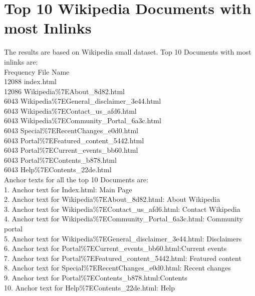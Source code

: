 \documentclass[12pt]{report}
\begin{document}
\section{Top 10 Wikipedia Documents with most Inlinks}
The results are based on Wikipedia small dataset.
 Top 10 Documents with most inlinks are:\\
Frequency File Name\\
  12088 index.html\\
  12086 Wikipedia\%7EAbout\_8d82.html\\
   6043 Wikipedia\%7EGeneral\_disclaimer\_3e44.html\\
   6043 Wikipedia\%7EContact\_us\_afd6.html\\
   6043 Wikipedia\%7ECommunity\_Portal\_6a3c.html\\
   6043 Special\%7ERecentChanges\_e0d0.html\\
   6043 Portal\%7EFeatured\_content\_5442.html\\
   6043 Portal\%7ECurrent\_events\_bb60.html\\
   6043 Portal\%7EContents\_b878.html\\
   6043 Help\%7EContents\_22de.html\\

Anchor texts for all the top 10 Documents are:\\

1. Anchor text for Index.html: Main Page\\
2. Anchor text for Wikipedia\%7EAbout\_8d82.html: About Wikipedia\\ 
3. Anchor text for Wikipedia\%7EContact\_us\_afd6.html: Contact Wikipedia\\
4. Anchor text for Wikipedia\%7ECommunity\_Portal\_6a3c.html: Community portal\\
5. Anchor text for Wikipedia\%7EGeneral\_disclaimer\_3e44.html: Disclaimers\\
6. Anchor text for Portal\%7ECurrent\_events\_bb60.html:Current events\\
7. Anchor text for Portal\%7EFeatured\_content\_5442.html: Featured content\\
8. Anchor text for Special\%7ERecentChanges\_e0d0.html: Recent changes\\
9. Anchor text for Portal\%7EContents\_b878.html:Contents\\
10. Anchor text for Help\%7EContents\_22de.html: Help\\
\end{document}
